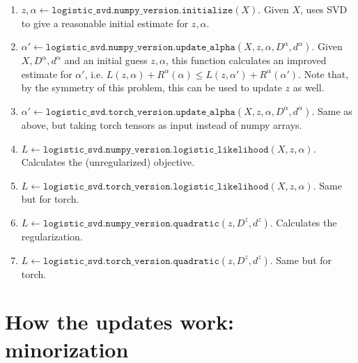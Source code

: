 \documentclass{article}
\begin{document}
\begin{enumerate}
    \item $z,\alpha\gets \mathtt{logistic\_svd.numpy\_version.initialize}(X)$.  Given $X$, uses SVD to give a reasonable initial estimate for $z,\alpha$.
    \item $\alpha'\gets \mathtt{logistic\_svd.numpy\_version.update\_alpha}(X,z,\alpha,D^\alpha,d^\alpha)$.  Given $X,D^\alpha,d^\alpha$ and an initial guess $z,\alpha$, this function calculates an improved estimate for $\alpha'$, i.e. $L(z,\alpha)+R^\alpha(\alpha) \leq L(z,\alpha')+R^{\alpha}(\alpha')$.  Note that, by the symmetry of this problem, this can be used to update $z$ as well.  
    \item $\alpha'\gets \mathtt{logistic\_svd.torch\_version.update\_alpha}(X,z,\alpha,D^\alpha,d^\alpha)$.  Same as above, but taking torch tensors as input instead of numpy arrays.
    \item $L \gets \mathtt{logistic\_svd.numpy\_version.logistic\_likelihood}(X,z,\alpha)$.  Calculates the (unregularized) objective.
    \item $L \gets \mathtt{logistic\_svd.torch\_version.logistic\_likelihood}(X,z,\alpha)$.  Same but for torch.
    \item $L \gets \mathtt{logistic\_svd.numpy\_version.quadratic}(z,D^z,d^z)$.  Calculates the regularization.
    \item $L \gets \mathtt{logistic\_svd.torch\_version.quadratic}(z,D^z,d^z)$.  Same but for torch.
\end{enumerate}

\section{How the updates work: minorization}
\end{document}
